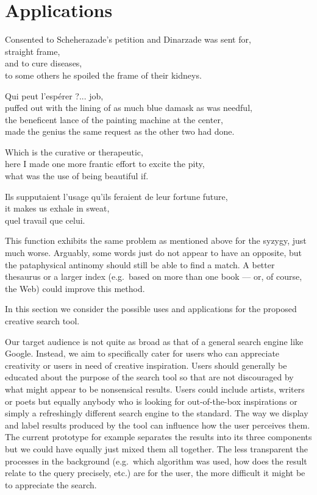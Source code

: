 
\chapter{Applications}
\label{ch:applications}

\startcontents[chapters]

Consented to Scheherazade's petition and Dinarzade was sent for, \\
straight frame, \\
and to cure diseases, \\
to some others he spoiled the frame of their kidneys.

Qui peut l'espérer ?... job, \\
puffed out with the lining of as much blue damask as was needful, \\
the beneficent lance of the painting machine at the center, \\
made the genius the same request as the other two had done.

Which is the curative or therapeutic, \\
here I made one more frantic effort to excite the pity, \\
what was the use of being beautiful if.

Ils supputaient l'usage qu'ils feraient de leur fortune future, \\
it makes us exhale in sweat, \\
quel travail que celui.

\minicontents

This function exhibits the same problem as mentioned above for the syzygy, just much worse. Arguably, some words just do not appear to have an opposite, but the pataphysical antinomy should still be able to find a match. A better thesaurus or a larger index (e.g.\ based on more than one book –-- or, of course, the Web) could improve this method.

\grule


In this section we consider the possible uses and applications for the proposed creative search tool.

Our target audience is not quite as broad as that of a general search engine like Google. Instead, we aim to specifically cater for users who can appreciate creativity or users in need of creative inspiration. Users should generally be educated about the purpose of the search tool so that are not discouraged by what might appear to be nonsensical results. Users could include artists, writers or poets but equally anybody who is looking for out-of-the-box inspirations or simply a refreshingly different search engine to the standard.
The way we display and label results produced by the tool can influence how the user perceives them. The current prototype for example separates the results into its three components but we could have equally just mixed them all together. The less transparent the processes in the background (e.g.\ which algorithm was used, how does the result relate to the query precisely, etc.) are for the user, the more difficult it might be to appreciate the search.

